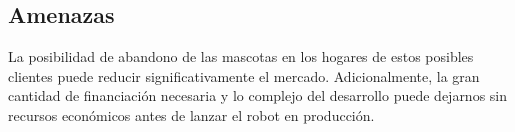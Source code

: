 
\subsection{Amenazas}

La posibilidad de abandono de las mascotas en los hogares de estos posibles clientes puede reducir significativamente el mercado. Adicionalmente, la gran cantidad de financiación necesaria y lo complejo del desarrollo puede dejarnos sin recursos económicos antes de lanzar el robot en producción.